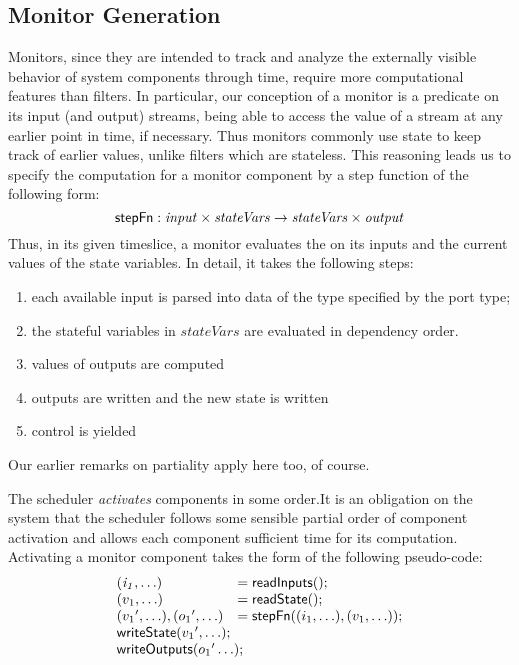 
\subsection{Monitor Generation}

Monitors, since they are intended to track and analyze the externally visible behavior of system components through time, require more computational features than filters. In particular, our conception of a monitor is a predicate on its input (and output) streams, being able to access the value of a stream at any earlier point in time,  if necessary. Thus monitors commonly use state to keep track of earlier values, unlike filters which are stateless. This reasoning leads us to specify the  computation for a monitor component  by a step function of the following form:
\[
\mathsf{stepFn} : \mathit{input} \times \mathit{stateVars} \to \mathit{stateVars} \times \mathit{output}
\]
Thus, in its given timeslice, a monitor evaluates the  on its inputs and the current values of the state variables. In detail, it takes the following steps:

\begin{enumerate}

\item each available input is parsed into data of the type specified
by the port type;

\item the stateful variables in $\mathit{stateVars}$  are evaluated in dependency order.

\item values of outputs are computed

\item outputs are written and the new state is written

\item control is yielded
\end{enumerate}

Our earlier remarks on partiality apply here too, of course.


The scheduler \emph{activates} components in some order.It is an obligation on the system that the scheduler follows some sensible partial order of component activation and allows each component sufficient time for its computation.
 Activating a monitor component takes the form of the following pseudo-code: 
\[
\begin{array}{ll}
 \mathit{(i_1,\ldots)} & = \konst{readInputs}(); \\
 (v_1,\ldots) & = \konst{readState}() ; \\
 ({v_1}',\ldots), ({o_1}',\ldots) & = \konst{stepFn} ((i_1,\ldots),(v_1,\ldots)) ; \\
 \multicolumn{2}{l}{\konst{writeState}({v_1}',\ldots);} \\
 \multicolumn{2}{l}{\konst{writeOutputs}({o_1}'\ldots);} \\
\end{array}
\]

